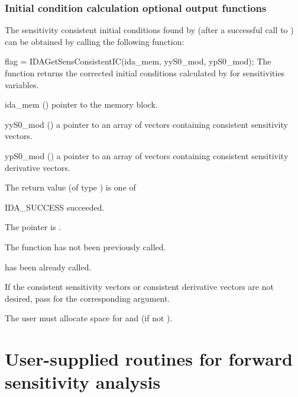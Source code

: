\subsubsection{Initial condition calculation optional output functions}
\label{sss:sens_optout_iccalc}

The sensitivity consistent initial conditions found by {\idas} (after a successful
call to ) can be obtained by calling the following function:

{
  flag = IDAGetSensConsistentIC(ida\_mem, yyS0\_mod, ypS0\_mod);
}
{
  The function  returns the corrected initial conditions
  calculated by  for sensitivities variables.
}
{
  \begin{args}
  \item[ida\_mem] ()
    pointer to the {\idas} memory block.
  \item[yyS0\_mod] ()
    a pointer to an array of  vectors containing consistent sensitivity 
    vectors.
  \item[ypS0\_mod] ()
    a pointer to an array of  vectors containing consistent sensitivity
    derivative vectors.
  \end{args}
}
{
  The return value  (of type ) is one of
  \begin{args}
  \item[IDA\_SUCCESS] 
     succeeded.
  \item[\Id{IDA\_MEM\_NULL}]
    The  pointer is .
  \item[\Id{IDA\_NO\_SENS}]
    The function  has not been previously called.
  \item[\Id{IDA\_ILL\_INPUT}]
     has been already called.
  \end{args}
}
{
  If the consistent sensitivity vectors or consistent derivative vectors
  are not desired, pass  for the corresponding argument.

  {\warn} The user must allocate space for  and 
  (if not ).
}
\section{User-supplied routines for forward sensitivity analysis}
\label{s:user_fct_fwd}

